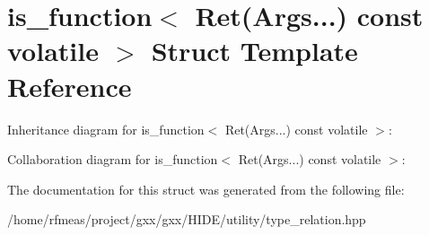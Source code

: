 \hypertarget{structis__function_3_01Ret_07Args_8_8_8_08_01const_01volatile_01_4}{}\section{is\+\_\+function$<$ Ret(Args...) const volatile $>$ Struct Template Reference}
\label{structis__function_3_01Ret_07Args_8_8_8_08_01const_01volatile_01_4}


Inheritance diagram for is\+\_\+function$<$ Ret(Args...) const volatile $>$\+:


Collaboration diagram for is\+\_\+function$<$ Ret(Args...) const volatile $>$\+:


The documentation for this struct was generated from the following file\+:\begin{DoxyCompactItemize}
\item 
/home/rfmeas/project/gxx/gxx/\+H\+I\+D\+E/utility/type\+\_\+relation.\+hpp\end{DoxyCompactItemize}
